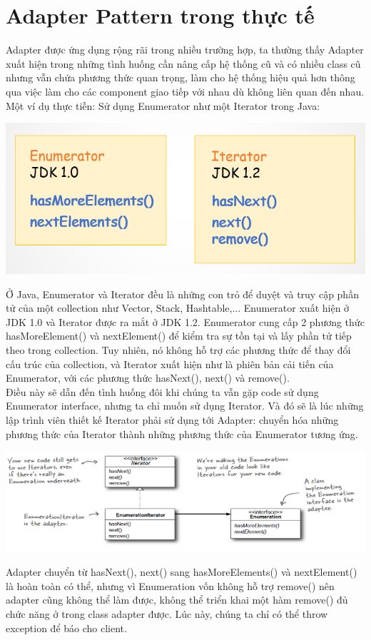 \section{Adapter Pattern trong thực tế}
Adapter được ứng dụng rộng rãi trong nhiều trường hợp, ta thường thấy Adapter xuất hiện trong những tình huống cần nâng cấp hệ thống cũ và có nhiều class cũ nhưng vẫn chứa phương thức quan trọng, làm cho hệ thống hiệu quả hơn thông qua việc làm cho các component giao tiếp với nhau dù không liên quan đến nhau. Một ví dụ thực tiễn: Sử dụng Enumerator như một Iterator trong Java:\\
\begin{center}
	\includegraphics{GALLEYS/images/chapter6/example1}\\
\end{center}

Ở Java, Enumerator và Iterator đều là những con trỏ để duyệt và truy cập phần tử của một collection như Vector, Stack, Hashtable,... Enumerator xuất hiện ở JDK 1.0 và Iterator được ra mắt ở JDK 1.2. Enumerator cung cấp 2 phương thức hasMoreElement() và nextElement() để kiểm tra sự tồn tại và lấy phần tử tiếp theo trong collection. Tuy nhiên, nó không hỗ trợ các phương thức để thay đổi cấu trúc của collection, và Iterator xuất hiện như là phiên bản cải tiến của Enumerator, với các phương thức hasNext(), next() và remove().\\

Điều này sẽ dẫn đến tình huống đôi khi chúng ta vẫn gặp code sử dụng Enumerator interface, nhưng ta chỉ muốn sử dụng Iterator. Và đó sẽ là lúc những lập trình viên thiết kế Iterator phải sử dụng tới Adapter: chuyển hóa những phương thức của Iterator thành những phương thức của Enumerator tương ứng.\\
\begin{center}
	\includegraphics{GALLEYS/images/chapter6/example2}\\
\end{center}

Adapter chuyển từ hasNext(), next() sang hasMoreElements() và nextElement() là hoàn toàn có thể, nhưng vì Enumeration vốn không hỗ trợ remove() nên adapter cũng không thể làm được, không thể triển khai một hàm remove() đủ chức năng ở trong class adapter được. Lúc này, chúng ta chỉ có thể throw exception để báo cho client.